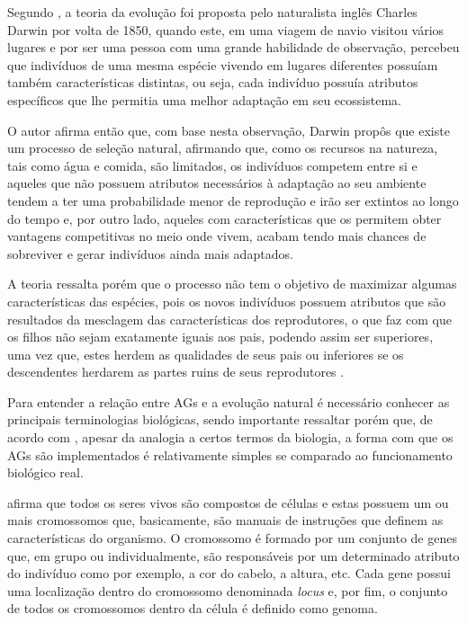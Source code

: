 \par Segundo , a teoria da evolução foi proposta pelo naturalista
inglês Charles Darwin por volta de 1850, quando este, em uma viagem de navio
visitou vários lugares e por ser uma pessoa com uma grande habilidade de  observação, percebeu que indivíduos de uma mesma espécie vivendo em lugares diferentes possuíam também
características distintas, ou seja, cada indivíduo  possuía atributos
específicos que lhe permitia uma melhor adaptação em seu ecossistema. 


\par O autor afirma então que, com base nesta observação, Darwin propôs que existe um processo de
seleção natural, afirmando que, como os recursos na natureza, tais como água e comida,
são limitados, os indivíduos competem entre si e aqueles que não possuem atributos necessários
à adaptação ao seu ambiente tendem a ter uma probabilidade menor de reprodução e
irão ser extintos ao longo do tempo e, por outro lado, aqueles
com características que os permitem obter vantagens competitivas no meio onde
vivem, acabam tendo mais chances de sobreviver e gerar indivíduos ainda mais
adaptados. 

\par A teoria ressalta porém que o processo não tem o objetivo de maximizar
algumas características das espécies, pois  os novos indivíduos
possuem atributos que são resultados da mesclagem das características dos reprodutores,
o que faz com que os filhos não sejam exatamente iguais aos pais, podendo assim
ser superiores, uma vez que, estes herdem as qualidades de seus pais ou
inferiores se os descendentes herdarem as partes ruins de seus
reprodutores \cite{livro_ags_ricardo_linden}.

\par Para entender a relação entre AGs e a evolução natural é
necessário conhecer as principais terminologias biológicas, 
sendo importante ressaltar porém que, de acordo com
, apesar da 
analogia a certos termos da biologia, a forma com que os AGs 
são implementados é relativamente simples se comparado ao funcionamento
biológico real.

\par {} afirma que 
todos os seres vivos são compostos de células e estas possuem um ou mais
cromossomos que, basicamente, são manuais de instruções que definem as 
características do organismo. O cromossomo é formado por um conjunto de genes
que, em grupo ou individualmente, são responsáveis por um determinado atributo
do indivíduo como por exemplo, a cor do cabelo, a altura, etc. Cada gene possui
uma localização dentro do cromossomo denominada \textit{locus} e, por fim, o
conjunto de todos os cromossomos dentro da célula é definido como genoma. 

